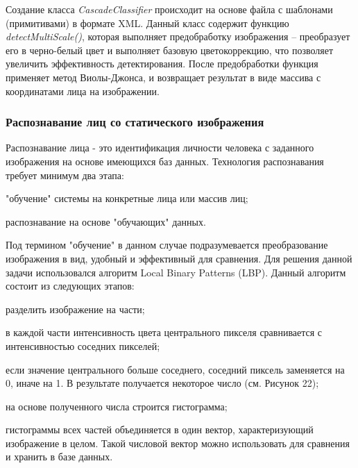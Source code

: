 Создание класса \textit{CascadeClassifier} происходит на основе файла с шаблонами
(примитивами) в формате XML. Данный класс содержит функцию
\textit{detectMultiScale()}, которая выполняет предобработку изображения --
преобразует его в черно-белый цвет и выполняет базовую цветокоррекцию, что
позволяет увеличить эффективность детектирования. После предобработки функция
применяет метод Виолы-Джонса, и возвращает результат в виде массива
с координатами лица на изображении. 

\subsubsection{Распознавание лиц со статического изображения}

Распознавание лица - это идентификация личности человека с заданного
изображения на основе имеющихся баз данных. Технология распознавания требует
минимум два этапа:

\begin{itemize*}
\item "обучение" системы на конкретные лица или массив лиц;
\item распознавание на основе "обучающих" данных.
\end{itemize*}

Под термином "обучение" в данном случае подразумевается преобразование
изображения в вид, удобный и эффективный для сравнения.
Для решения данной задачи использовался алгоритм Local Binary Patterns (LBP).
Данный алгоритм состоит из следующих этапов:

\begin{itemize*}
  \item разделить изображение на части;
  \item в каждой части интенсивность цвета центрального пикселя сравнивается
    с интенсивностью соседних пикселей;
  \item если значение центрального больше соседнего, соседний пиксель
    заменяется на 0, иначе на 1. В результате получается некоторое число (см.
    Рисунок 22);
  \item на основе полученного числа строится гистограмма;
  \item гистограммы всех частей объединяется в один вектор, характеризующий
    изображение в целом. Такой числовой вектор можно использовать для сравнения
    и хранить в базе данных.
\end{itemize*}


